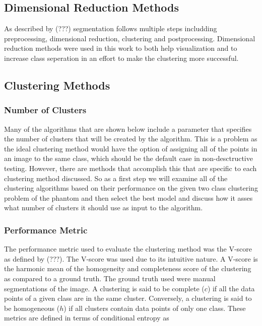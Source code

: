 \documentclass[journal, a4paper]{IEEEtran}
\begin{document}

\subsection{Dimensional Reduction Methods}

As described by (???) segmentation follows multiple steps includding preprocessing, dimensional reduction, clustering and postprocessing. Dimensional reduction methods were used in this work to both help visualization and to increase class seperation in an effort to make the clustering more successful.

\subsection{Clustering Methods}



\subsubsection{Number of Clusters}

Many of the algorithms that are shown below include a parameter that specifies the number of clusters that will be created by the algorithm. This is a problem as the ideal clustering method would have the option of assigning all of the points in an image to the same class, which should be the default case in non-desctructive testing. However, there are methods that accomplish this that are specific to each clustering method discussed. So as a first step we will examine all of the clustering algorithms based on their performance on the given two class clustering problem of the phantom and then select the best model and discuss how it asses what number of clusters it should use as input to the algorithm.

\subsubsection{Performance Metric}

The performance metric used to evaluate the clustering method was the V-score as defined by (???). The V-score was used due to its intuitive nature. A V-score is the harmonic mean of the homogeneity and completeness score of the clustering as compared to a ground truth. The ground truth used were manual segmentations of the image. A clustering is said to be complete ($c$) if all the data points of a given class are in the same cluster. Conversely, a clustering is said to be homogeneous ($h$) if all clusters contain data points of only one class. These metrics are defined in terms of conditional entropy as
\end{document}
